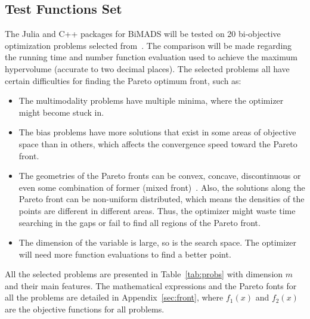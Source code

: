 \documentclass[11pt,oneside,onecolumn,openright]{article}
\begin{document}
  \subsection{Test Functions Set}
  The Julia and C++ packages for BiMADS will be tested on 20 bi-objective optimization problems selected from~\cite{zitzler2000comparison,davidor1994parallel,huband2006review,brockhoff2016using,deb2002scalable}. The comparison will be made regarding the running time and number function evaluation used to achieve the maximum hypervolume (accurate to two decimal places). The selected problems all have certain difficulties for finding the Pareto optimum front, such as:
  \begin{itemize}
  \item The multimodality problems have multiple minima, where the optimizer might become stuck in.
  \item The bias problems have more solutions that exist in some areas of objective space than in others, which affects the convergence speed toward the Pareto front.
  \item The geometries of the Pareto fronts can be convex, concave, discontinuous or even some combination of former (mixed front)~\cite{huband2006review}. Also, the solutions along the Pareto front can be non-uniform distributed, which means the densities of the points are different in different areas. Thus, the optimizer might waste time searching in the gaps or fail to find all regions of the Pareto front.
  \item The dimension of the variable is large, so is the search space. The optimizer will need more function evaluations to find a better point.
  \end{itemize}

  All the selected problems are presented in Table~\ref{tab:probs} with dimension $m$ and their main features. The mathematical expressions and the Pareto fonts for all the problems are detailed in Appendix~\ref{sec:front}, where $f_1(x)$ and $f_2(x)$ are the objective functions for all problems.
\end{document}
